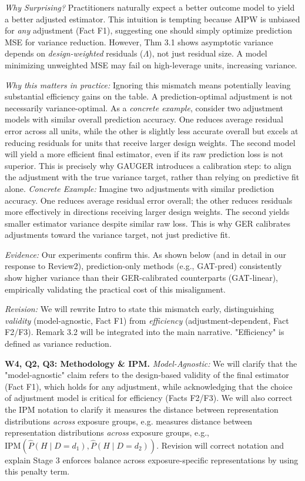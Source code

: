 \documentclass{article}
\theoremstyle{plain}
\theoremstyle{definition}
\theoremstyle{remark}
\begin{document}
\textit{Why Surprising?} Practitioners naturally expect a better outcome model to yield a better adjusted estimator. This intuition is tempting because AIPW is unbiased for \emph{any} adjustment (Fact F1), suggesting one should simply optimize prediction MSE for variance reduction. However, Thm 3.1 shows asymptotic variance depends on \emph{design-weighted} residuals ($\Lambda$), not just residual size. A model minimizing unweighted MSE may fail on high-leverage units, increasing variance.

\textit{Why this matters in practice:} Ignoring this mismatch means potentially leaving substantial efficiency gains on the table. A prediction-optimal adjustment is not necessarily variance-optimal. As a \textit{concrete example}, consider two adjustment models with similar overall prediction accuracy. One reduces average residual error across all units, while the other is slightly less accurate overall but excels at reducing residuals for units that receive larger design weights. The second model will yield a more efficient final estimator, even if its raw prediction loss is not superior. This is precisely why GAUGER introduces a calibration step: to align the adjustment with the true variance target, rather than relying on predictive fit alone.
\textit{Concrete Example:} Imagine two adjustments with similar prediction accuracy. One reduces average residual error overall; the other reduces residuals more effectively in directions receiving larger design weights. The second yields smaller estimator variance despite similar raw loss. This is why GER calibrates adjustments toward the variance target, not just predictive fit. 

\textit{Evidence:} Our experiments confirm this. As shown below (and in detail in our response to Review2), prediction-only methods (e.g., GAT-pred) consistently show higher variance than their GER-calibrated counterparts (GAT-linear), empirically validating the practical cost of this misalignment.

\textit{Revision:} We will rewrite Intro to state this mismatch early, distinguishing \emph{validity} (model-agnostic, Fact F1) from \emph{efficiency} (adjustment-dependent, Fact F2/F3). Remark 3.2 will be integrated into the main narrative. "Efficiency" is defined as variance reduction.

\vspace{0.5em}
\noindent\textbf{W4, Q2, Q3: Methodology \& IPM.}
\textit{Model-Agnostic:} We will clarify that the "model-agnostic" claim refers to the design-based validity of the final estimator (Fact F1), which holds for any adjustment, while acknowledging that the choice of adjustment model is critical for efficiency (Facts F2/F3). We will also correct the IPM notation to clarify it measures the distance between representation distributions \emph{across} exposure groups, e.g. measures distance between representation distributions \emph{across} exposure groups, e.g., $\mathrm{IPM}(\widehat P(H \mid D=d_1), \widehat P(H \mid D=d_2))$. Revision will correct notation and explain Stage 3 enforces balance across exposure-specific representations by using this penalty term.
\end{document}
